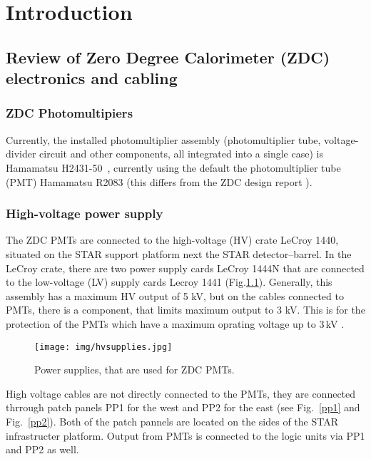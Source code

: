 \chapter{Introduction}

\section{Review of Zero Degree Calorimeter (ZDC) electronics and cabling}
\subsection{ZDC Photomultipiers}
Currently, the installed photomultiplier assembly (photomultiplier tube, voltage-divider circuit and other components, all integrated into a single case) is Hamamatsu H2431-50~\cite{PMTtube}, currently using the default the photomultiplier tube (PMT) Hamamatsu R2083 (this differs from the ZDC design report \cite{ZDCdocumentation}).

\subsection{High-voltage power supply}
The ZDC PMTs are connected to the high-voltage (HV) crate LeCroy 1440, situated on the STAR support platform next the STAR detector--barrel. In the LeCroy crate, there are two power supply cards LeCroy 1444N that are connected to the low-voltage (LV) supply cards Lecroy 1441 (Fig.\ref{hvsupplies}). Generally, this assembly has a maximum HV output of 5 kV, but on the cables connected to PMTs, there is a component, that limits maximum output to 3 kV. This is for the protection of the PMTs which have a maximum oprating voltage up to 3$\,$kV \cite{PMTtube}.

\begin{figure}[htb]
\begin{center}
\texttt{[image: img/hvsupplies.jpg]}
\end{center}
\caption{Power supplies, that are used for ZDC PMTs.}
\label{hvsupplies}
\end{figure}

High voltage cables are not directly connected to the PMTs, they are connected thrrough patch panels PP1 for the west and PP2 for the east (see Fig.~\ref{pp1} and Fig.~\ref{pp2}). Both of the patch pannels are located on the sides of the STAR infrastructer platform. Output from PMTs is connected to the logic units via PP1 and PP2 as well.

